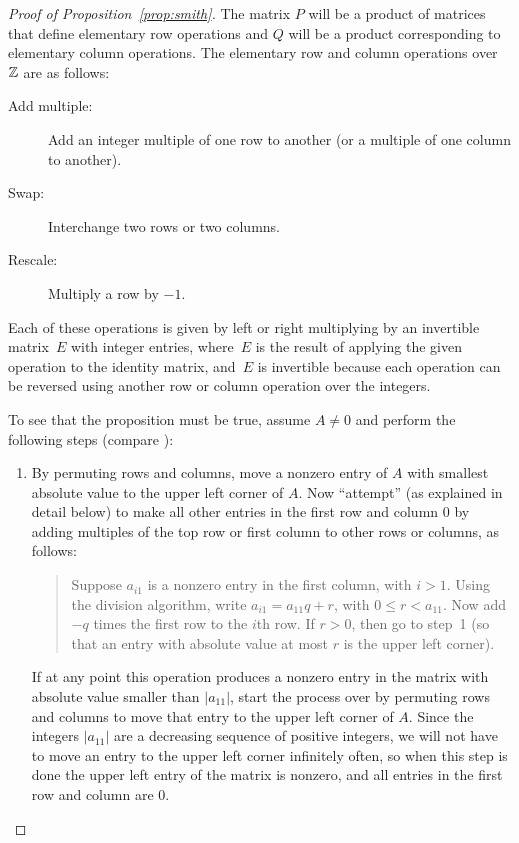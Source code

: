 \begin{proof}[Proof of Proposition~\ref{prop:smith}]
The matrix $P$ will be a product of matrices that define elementary
row operations and $Q$ will be a product corresponding to elementary
column operations.  The elementary row and column operations over
$\mathbb{Z}$ are as follows:
\begin{description}
  \item[Add multiple:]
    Add an integer multiple of one row to another
    (or a multiple of one column to another).
  \item[Swap:]
    Interchange two rows or two columns.
  \item[Rescale:]
    Multiply a row by $-1$.
\end{description}
Each of these operations is given by left or right multiplying by an
invertible matrix~$E$ with integer entries, where~$E$ is the result of
applying the given operation to the identity matrix, and~$E$ is
invertible because each operation can be reversed using another row or
column operation over the integers.

To see that the proposition must be true, assume $A\neq 0$ and perform
the following steps (compare \cite[pg.~459]{artin:algebra}):
\begin{enumerate}
  \item By permuting rows and columns, move a nonzero entry of $A$ with
  smallest absolute value to the upper left corner of $A$.  Now
  ``attempt'' (as explained in detail below) to make all other entries
  in the first row and column $0$ by adding multiples of the top row
  or first column to other rows or columns, as follows:
  \begin{quote}
    Suppose $a_{i1}$ is a nonzero entry in the first column, with
    $i>1$.  Using the division algorithm, write
    $a_{i1} = a_{11}q + r$, with $0\leq r < a_{11}$. Now add $-q$
    times the first row to the $i$th row. If $r>0$, then go to step~1
    (so that an entry with absolute value at most $r$ is the upper
    left corner).
  \end{quote}
  If at any point this operation produces a nonzero entry in the
  matrix with absolute value smaller than $|a_{11}|$, start the
  process over by permuting rows and columns to move that entry to the
  upper left corner of $A$.  Since the integers $|a_{11}|$ are a
  decreasing sequence of positive integers, we will not have to move
  an entry to the upper left corner infinitely often, so when this
  step is done the upper left entry of the matrix is nonzero, and all
  entries in the first row and column are $0$.


\end{enumerate}
\end{proof}
